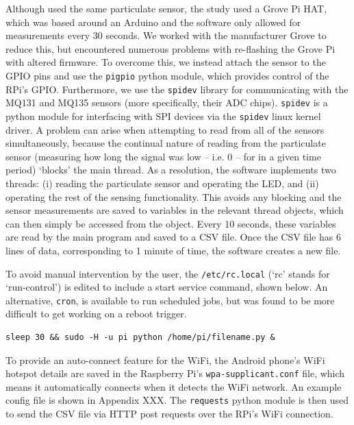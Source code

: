 \documentclass[11pt]{report}
\begin{document}
Although \cite{thorpe2017RPimesh} used the same particulate sensor, the study used a Grove Pi HAT, which was based around an Arduino and the software only allowed for measurements every 30 seconds. We worked with the manufacturer Grove to reduce this, but encountered numerous problems with re-flashing the Grove Pi with altered firmware. To overcome this, we instead attach the sensor to the GPIO pins and use the \texttt{pigpio} python module, which provides control of the RPi's GPIO. Furthermore, we use the \texttt{spidev} library for communicating with the MQ131 and MQ135 sensors (more specifically, their ADC chips). \texttt{spidev} is a python module for interfacing with SPI devices via the \texttt{spidev} linux kernel driver. A problem can arise when attempting to read from all of the sensors simultaneously, because the continual nature of reading from the particulate sensor (measuring how long the signal was low -- i.e. 0 -- for in a given time period) `blocks' the main thread. As a resolution, the software implements two threads: (i) reading the particulate sensor and operating the LED, and (ii) operating the rest of the sensing functionality. This avoids any blocking and the sensor measurements are saved to variables in the relevant thread objects, which can then simply be accessed from the object. Every 10 seconds, these variables are read by the main program and saved to a CSV file. Once the CSV file has 6 lines of data, corresponding to 1 minute of time, the software creates a new file.

To avoid manual intervention by the user, the \texttt{/etc/rc.local} (`rc' stands for `run-control') is edited to include a start service command, shown below. An alternative, \texttt{cron}, is available to run scheduled jobs, but was found to be more difficult to get working on a reboot trigger.
\begin{lstlisting}
sleep 30 && sudo -H -u pi python /home/pi/filename.py &
\end{lstlisting}

To provide an auto-connect feature for the WiFi, the Android phone's WiFi hotspot details are saved in the Raspberry Pi's \texttt{wpa-supplicant.conf} file, which means it automatically connects when it detects the WiFi network. An example config file is shown in Appendix XXX. The \texttt{requests} python module is then used to send the CSV file via HTTP post requests over the RPi's WiFi connection.
\end{document}
